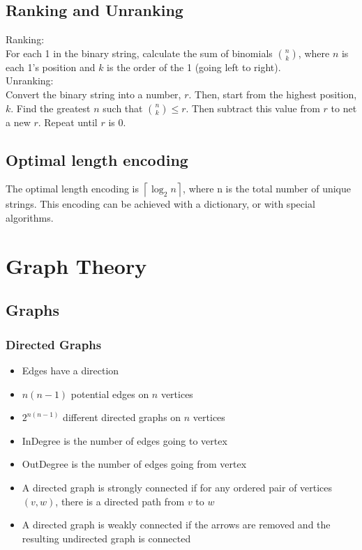 \documentclass{article}
\begin{document}
\begin{spacing}{1.5}
\subsection{Ranking and Unranking}
\label{sec:ranking}
Ranking:\\
For each 1 in the binary string, calculate the sum of binomials $\binom{n}{k}$, where $n$ is each 1's position and $k$ is the order of the 1 (going left to right).\\
Unranking:\\
Convert the binary string into a number, $r$. Then, start from the highest position, $k$. Find the greatest $n$ such that $\binom{n}{k} \leq r$. Then subtract this value from $r$ to net a new $r$. Repeat until $r$ is $0$.\\
\subsection{Optimal length encoding}
\label{sec:optimal}
The optimal length encoding is $\left \lceil \log_2 n \right \rceil$, where n is the total number of unique strings. This encoding can be achieved with a dictionary, or with special algorithms.\\

\section{Graph Theory}
\label{sec:graphtheory}
\subsection{Graphs}
\label{sec:graphs}
\subsubsection{Directed Graphs}
\label{sec:directed}
\begin{spacing}{1.0}
\begin{itemize}
    \item Edges have a direction
    \item $n(n-1)$ potential edges on $n$ vertices
    \item $2^{n(n-1)}$ different directed graphs on $n$ vertices
    \item InDegree is the number of edges going to vertex
    \item OutDegree is the number of edges going from vertex
    \item A directed graph is strongly connected if for any ordered pair of vertices $(v,w)$, there is a directed path from $v$ to $w$
    \item A directed graph is weakly connected if the arrows are removed and the resulting undirected graph is connected
\end{itemize}

\end{spacing}
\end{spacing}
\end{document}
